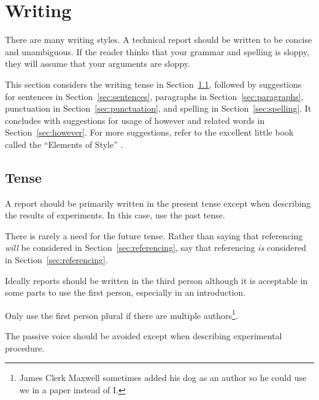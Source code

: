 \documentclass[a4paper,12pt]{article}
\newcommand{\refsec}[1]{\mbox{Section~\ref{sec:#1}}}
\newcounter{foo}
\newcounter{bar}
\renewcommand{\cite}{\citep}
\begin{document}
\section{Writing}
\label{sec:writing_style}

There are many writing styles.  A technical report should be written
to be concise and unambiguous.  If the reader thinks that your grammar
and spelling is sloppy, they will assume that your arguments are
sloppy.


This section considers the writing tense in \refsec{tense}, followed
by suggestions for sentences in \refsec{sentences}, paragraphs in
\refsec{paragraphs}, punctuation in \refsec{punctuation}, and spelling
in \refsec{spelling}.  It concludes with suggestions for usage of
however and related words in \refsec{however}.  For more suggestions,
refer to the excellent little book called the ``Elements of Style''
\cite{Strunk_1979}.


\subsection{Tense}
\label{sec:tense}

\begin{list}{W-}{}

\item A report should be primarily written in the present tense except
  when describing the results of experiments.  In this case, use the
  past tense.

\item There is rarely a need for the future tense.  Rather than saying
  that referencing \emph{will} be considered in \refsec{referencing},
  say that referencing \emph{is} considered in \refsec{referencing}.

\item Ideally reports should be written in the third person although
  it is acceptable in some parts to use the first person, especially
  in an introduction.

\item Only use the first person plural if there are multiple
  authors\footnote{James Clerk Maxwell sometimes added his dog as an
    author so he could use we in a paper instead of I.}.

\item The passive voice should be avoided except when describing
  experimental procedure.

\setcounter{bar}{\value{foo}}
\end{list}
\end{document}
